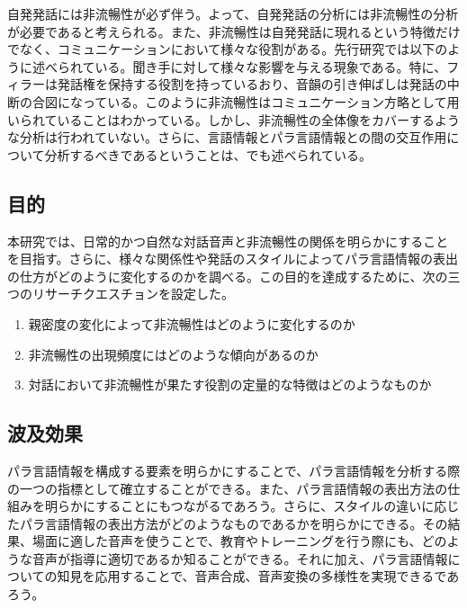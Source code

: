 自発発話には非流暢性が必ず伴う。よって、自発発話の分析には非流暢性の分析が必要であると考えられる。また、非流暢性は自発発話に現れるという特徴だけでなく、コミュニケーションにおいて様々な役割がある。先行研究では以下のように述べられている。聞き手に対して様々な影響を与える現象である。特に、フィラーは発話権を保持する役割を持っているおり、音韻の引き伸ばしは発話の中断の合図になっている\cite{den}。このように非流暢性はコミュニケーション方略として用いられていることはわかっている。しかし、非流暢性の全体像をカバーするような分析は行われていない。さらに、言語情報とパラ言語情報との間の交互作用について分析するべきであるということは、\cite{maekawa_kitagawa}でも述べられている。


\newpage


\subsection{目的}\label{section_mokuhyou}
本研究では、日常的かつ自然な対話音声と非流暢性の関係を明らかにすることを目指す。さらに、様々な関係性や発話のスタイルによってパラ言語情報の表出の仕方がどのように変化するのかを調べる。この目的を達成するために、次の三つのリサーチクエスチョンを設定した。

\begin{enumerate}
  \item 親密度の変化によって非流暢性はどのように変化するのか
  \item 非流暢性の出現頻度にはどのような傾向があるのか
  \item 対話において非流暢性が果たす役割の定量的な特徴はどのようなものか

\end{enumerate}

\subsection{波及効果}

パラ言語情報を構成する要素を明らかにすることで、パラ言語情報を分析する際の一つの指標として確立することができる。また、パラ言語情報の表出方法の仕組みを明らかにすることにもつながるであろう。さらに、スタイルの違いに応じたパラ言語情報の表出方法がどのようなものであるかを明らかにできる。その結果、場面に適した音声を使うことで、教育やトレーニングを行う際にも、どのような音声が指導に適切であるか知ることができる。それに加え、パラ言語情報についての知見を応用することで、音声合成、音声変換の多様性を実現できるであろう。


